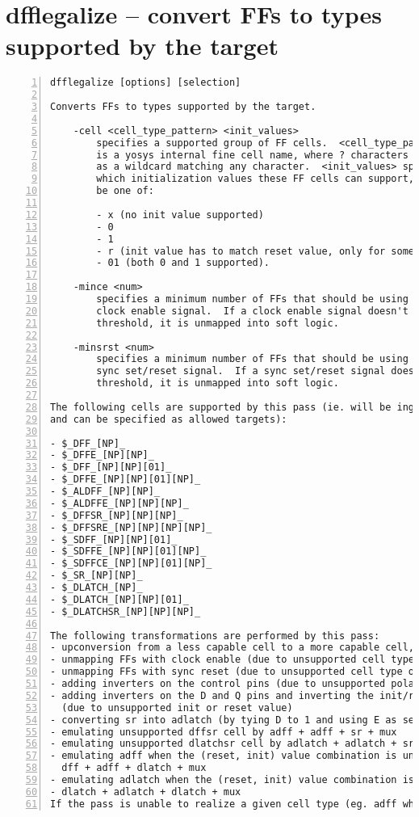 \section{dfflegalize -- convert FFs to types supported by the target}
\label{cmd:dfflegalize}
\begin{lstlisting}[numbers=left,frame=single]
    dfflegalize [options] [selection]

Converts FFs to types supported by the target.

    -cell <cell_type_pattern> <init_values>
        specifies a supported group of FF cells.  <cell_type_pattern>
        is a yosys internal fine cell name, where ? characters can be
        as a wildcard matching any character.  <init_values> specifies
        which initialization values these FF cells can support, and can
        be one of:

        - x (no init value supported)
        - 0
        - 1
        - r (init value has to match reset value, only for some FF types)
        - 01 (both 0 and 1 supported).

    -mince <num>
        specifies a minimum number of FFs that should be using any given
        clock enable signal.  If a clock enable signal doesn't meet this
        threshold, it is unmapped into soft logic.

    -minsrst <num>
        specifies a minimum number of FFs that should be using any given
        sync set/reset signal.  If a sync set/reset signal doesn't meet this
        threshold, it is unmapped into soft logic.

The following cells are supported by this pass (ie. will be ingested,
and can be specified as allowed targets):

- $_DFF_[NP]_
- $_DFFE_[NP][NP]_
- $_DFF_[NP][NP][01]_
- $_DFFE_[NP][NP][01][NP]_
- $_ALDFF_[NP][NP]_
- $_ALDFFE_[NP][NP][NP]_
- $_DFFSR_[NP][NP][NP]_
- $_DFFSRE_[NP][NP][NP][NP]_
- $_SDFF_[NP][NP][01]_
- $_SDFFE_[NP][NP][01][NP]_
- $_SDFFCE_[NP][NP][01][NP]_
- $_SR_[NP][NP]_
- $_DLATCH_[NP]_
- $_DLATCH_[NP][NP][01]_
- $_DLATCHSR_[NP][NP][NP]_

The following transformations are performed by this pass:
- upconversion from a less capable cell to a more capable cell, if the less  capable cell is not supported (eg. dff -> dffe, or adff -> dffsr)
- unmapping FFs with clock enable (due to unsupported cell type or -mince)
- unmapping FFs with sync reset (due to unsupported cell type or -minsrst)
- adding inverters on the control pins (due to unsupported polarity)
- adding inverters on the D and Q pins and inverting the init/reset values
  (due to unsupported init or reset value)
- converting sr into adlatch (by tying D to 1 and using E as set input)
- emulating unsupported dffsr cell by adff + adff + sr + mux
- emulating unsupported dlatchsr cell by adlatch + adlatch + sr + mux
- emulating adff when the (reset, init) value combination is unsupported by
  dff + adff + dlatch + mux
- emulating adlatch when the (reset, init) value combination is unsupported by
- dlatch + adlatch + dlatch + mux
If the pass is unable to realize a given cell type (eg. adff when only plain dffis available), an error is raised.
\end{lstlisting}

